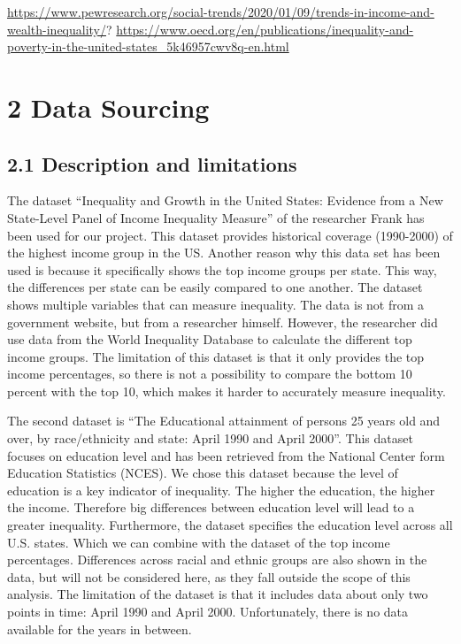\documentclass[
]{article}
\begin{document}
\url{https://www.pewresearch.org/social-trends/2020/01/09/trends-in-income-and-wealth-inequality/}?
\url{https://www.oecd.org/en/publications/inequality-and-poverty-in-the-united-states_5k46957cwv8q-en.html}

\section{2 Data Sourcing}\label{data-sourcing}

\subsection{2.1 Description and
limitations}\label{description-and-limitations}

The dataset ``Inequality and Growth in the United States: Evidence from
a New State-Level Panel of Income Inequality Measure'' of the researcher
Frank has been used for our project. This dataset provides historical
coverage (1990-2000) of the highest income group in the US. Another
reason why this data set has been used is because it specifically shows
the top income groups per state. This way, the differences per state can
be easily compared to one another. The dataset shows multiple variables
that can measure inequality. The data is not from a government website,
but from a researcher himself. However, the researcher did use data from
the World Inequality Database to calculate the different top income
groups. The limitation of this dataset is that it only provides the top
income percentages, so there is not a possibility to compare the bottom
10 percent with the top 10, which makes it harder to accurately measure
inequality.

The second dataset is ``The Educational attainment of persons 25 years
old and over, by race/ethnicity and state: April 1990 and April 2000''.
This dataset focuses on education level and has been retrieved from the
National Center form Education Statistics (NCES). We chose this dataset
because the level of education is a key indicator of inequality. The
higher the education, the higher the income. Therefore big differences
between education level will lead to a greater inequality. Furthermore,
the dataset specifies the education level across all U.S. states. Which
we can combine with the dataset of the top income percentages.
Differences across racial and ethnic groups are also shown in the data,
but will not be considered here, as they fall outside the scope of this
analysis. The limitation of the dataset is that it includes data about
only two points in time: April 1990 and April 2000. Unfortunately, there
is no data available for the years in between.
\end{document}
